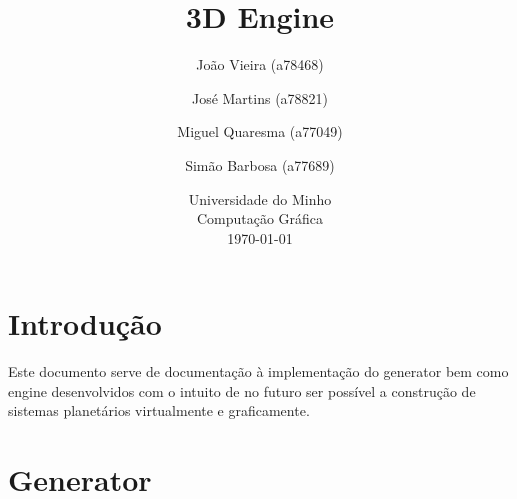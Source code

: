 \documentclass{article}
\begin{document}
\title{\vspace*{\fill}3D Engine}
\author{João Vieira (a78468) \and José Martins (a78821) \and Miguel Quaresma (a77049) \and Simão Barbosa (a77689)}
\date{%
    Universidade do Minho\\
    Computação Gráfica\\[2ex]%
    \today\vspace*{\fill}
}
\maketitle

\newpage

\tableofcontents

\newpage

\section{Introdução}
Este documento serve de documentação à implementação do generator bem como engine desenvolvidos com o intuito de no futuro ser possível a construção de sistemas planetários virtualmente e graficamente.

\newpage

\section{Generator}
\end{document}

